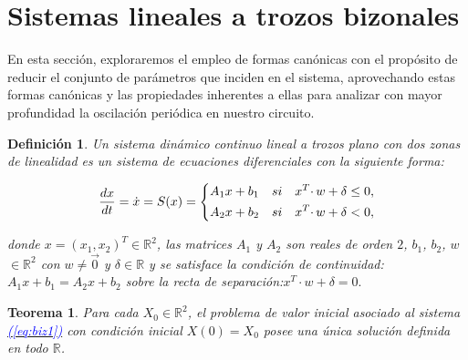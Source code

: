 \documentclass[12pt,a4paper]{report} %
\newtheorem{theorem}{Teorema}[chapter]
\newtheorem{definicion}{Definición}[chapter]
\newtheorem{definicion}{Definición}[chapter] %
\newcommand{\eref}[1]{\hyperref[#1]{\textcolor{blue}{(\ref*{#1})}}}
\newcommand{\eref}[1]{\hyperref[#1]{\textcolor{blue}{\textit{(\ref*{#1})}}}}
\begin{document}
	\newpage
	
	\section{Sistemas lineales a trozos bizonales}
	\label{sistrobiz}
	
	 En esta sección, exploraremos el empleo de formas canónicas con el propósito de reducir el conjunto de parámetros que inciden en el sistema, aprovechando estas formas canónicas y las propiedades inherentes a ellas para analizar con mayor profundidad la oscilación periódica en nuestro circuito.
	
	\vspace{0.5cm}\begin{definicion}
		Un sistema dinámico continuo lineal a trozos plano con dos zonas de linealidad es un sistema de ecuaciones diferenciales con la siguiente forma:
	
	\begin{equation}
		\frac{dx}{dt}=\dot{x}=S(x)=
		\label{eq:biz1}
		\scalebox{1}{$\displaystyle
			\left\{
			\begin{aligned}
			 A_1x+b_1\quad si \quad x^T\cdotp w+\delta \leq 0, \\
			 A_2x+b_2\quad si \quad x^T\cdotp w+\delta < 0,
			\end{aligned}
			\right.
			$}
	\end{equation}\smallskip
	
	\noindent donde $x=(x_1,x_2)^T\in \mathbb{R}^2$, las matrices $A_1$ y $A_2$ son reales de orden $2$, $b_1$, $b_2$, $w$ $\in \mathbb{R}^2$ con $w\neq\vec{0}$ y $\delta \in \mathbb{R}$ y se satisface la condición de continuidad: $A_1x+b_1=A_2x+b_2$ sobre la recta de separación:\quad $x^T\cdotp w+\delta = 0.$ 
	
	\end{definicion}
	
	\vspace{0.5cm}\begin{theorem}
		\label{teo:euvic}
		Para cada $X_0 \in \mathbb{R}^2$, el problema de valor inicial asociado al sistema \eref{eq:biz1} con condición inicial $X(0)=X_0$ posee una única solución definida en todo $\mathbb{R}$.
	\end{theorem}
	
\end{document}
